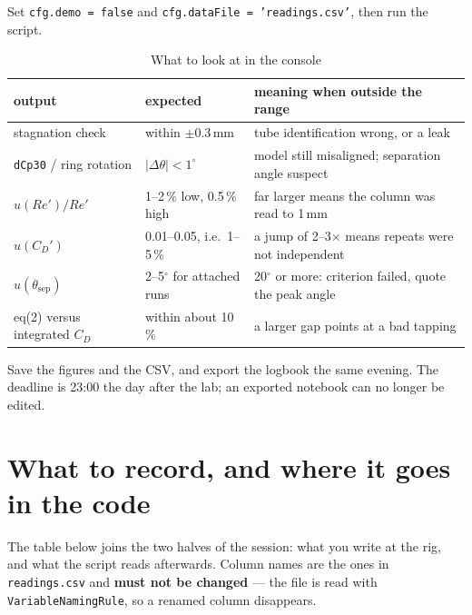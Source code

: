 \documentclass[11pt,a4paper]{article}
\newcommand{\CD}{\ensuremath{C_D}}
\newcommand{\ReD}{\ensuremath{\mathit{Re}}}
\begin{document}
Set \texttt{cfg.demo = false} and \texttt{cfg.dataFile = 'readings.csv'}, then run the script.

\begin{table}[H]
\centering
\caption{What to look at in the console}
\small
\begin{tabularx}{\textwidth}{@{}p{3.4cm} p{4.2cm} X@{}}
\toprule
output & expected & meaning when outside the range \\
\midrule
stagnation check & within $\pm0.3$\,mm & tube identification wrong, or a leak \\
\texttt{dCp30} / ring rotation & $|\Delta\theta| < 1^\circ$ & model still misaligned; separation angle suspect \\
$u(\ReD')/\ReD'$ & 1--2\,\% low, 0.5\,\% high & far larger means the column was read to 1\,mm \\
$u(\CD')$ & 0.01--0.05, i.e.\ 1--5\,\% & a jump of 2--3$\times$ means repeats were not independent \\
$u(\theta_{\text{sep}})$ & 2--5$^\circ$ for attached runs & 20$^\circ$ or more: criterion failed, quote the peak angle \\
eq(2) versus integrated \CD & within about 10\,\% & a larger gap points at a bad tapping \\
\bottomrule
\end{tabularx}
\end{table}

Save the figures and the CSV, and export the logbook the same evening. The deadline is 23:00 the day
after the lab; an exported notebook can no longer be edited.

\section{What to record, and where it goes in the code}

The table below joins the two halves of the session: what you write at the rig, and what the script
reads afterwards. Column names are the ones in \texttt{readings.csv} and \textbf{must not be
changed} --- the file is read with \texttt{VariableNamingRule}, so a renamed column disappears.
\end{document}
